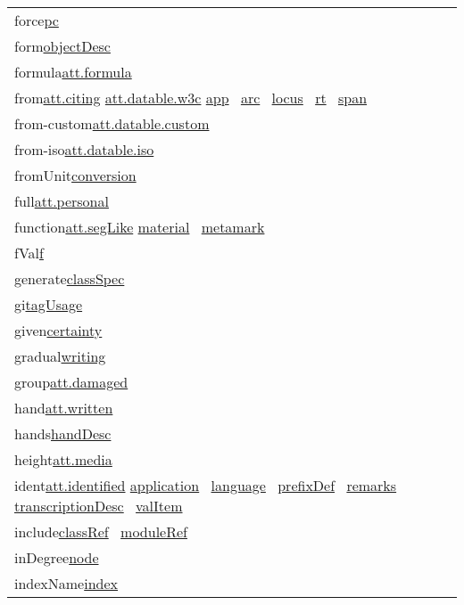 \begin{longtable}{L{.2\textwidth}P{.8\textwidth}}
force\tabcellsep \hyperref[TEI.pc]{pc} \\
form\tabcellsep \hyperref[TEI.objectDesc]{objectDesc} \\
formula\tabcellsep \hyperref[TEI.att.formula]{att.formula}\\
from\tabcellsep \hyperref[TEI.att.citing]{att.citing} \hyperref[TEI.att.datable.w3c]{att.datable.w3c} \hyperref[TEI.app]{app}  \hyperref[TEI.arc]{arc}  \hyperref[TEI.locus]{locus}  \hyperref[TEI.rt]{rt}  \hyperref[TEI.span]{span} \\
from-custom\tabcellsep \hyperref[TEI.att.datable.custom]{att.datable.custom}\\
from-iso\tabcellsep \hyperref[TEI.att.datable.iso]{att.datable.iso}\\
fromUnit\tabcellsep \hyperref[TEI.conversion]{conversion} \\
full\tabcellsep \hyperref[TEI.att.personal]{att.personal}\\
function\tabcellsep \hyperref[TEI.att.segLike]{att.segLike} \hyperref[TEI.material]{material}  \hyperref[TEI.metamark]{metamark} \\
fVal\tabcellsep \hyperref[TEI.f]{f} \\
generate\tabcellsep \hyperref[TEI.classSpec]{classSpec} \\
gi\tabcellsep \hyperref[TEI.tagUsage]{tagUsage} \\
given\tabcellsep \hyperref[TEI.certainty]{certainty} \\
gradual\tabcellsep \hyperref[TEI.writing]{writing} \\
group\tabcellsep \hyperref[TEI.att.damaged]{att.damaged}\\
hand\tabcellsep \hyperref[TEI.att.written]{att.written}\\
hands\tabcellsep \hyperref[TEI.handDesc]{handDesc} \\
height\tabcellsep \hyperref[TEI.att.media]{att.media}\\
ident\tabcellsep \hyperref[TEI.att.identified]{att.identified} \hyperref[TEI.application]{application}  \hyperref[TEI.language]{language}  \hyperref[TEI.prefixDef]{prefixDef}  \hyperref[TEI.remarks]{remarks}  \hyperref[TEI.transcriptionDesc]{transcriptionDesc}  \hyperref[TEI.valItem]{valItem} \\
include\tabcellsep \hyperref[TEI.classRef]{classRef}  \hyperref[TEI.moduleRef]{moduleRef} \\
inDegree\tabcellsep \hyperref[TEI.node]{node} \\
indexName\tabcellsep \hyperref[TEI.index]{index} \\

\end{longtable}
